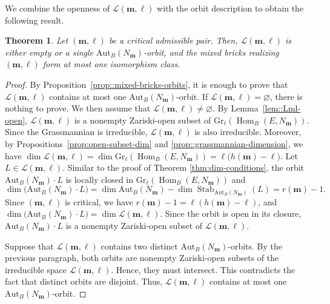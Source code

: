 \documentclass[a4,12pt]{amsart}
\numberwithin{equation}{section} %
\def\Hom{\operatorname{Hom}} %
\def\Stab{\operatorname{Stab}} %
\def\Gr{\mathrm{Gr}} %
\def\Aut{\mathrm{Aut}} %
\newtheorem{theorem}{Theorem}[section] %
\theoremstyle{definition} %
\begin{document}
We combine the openness of $\mathcal{L}(\mathbf{m},\ell)$ with the orbit description to obtain the following result.

\begin{theorem}\label{thm::critical-pair-one-orbit}
Let $(\mathbf{m},\ell)$ be a critical admissible pair. Then,
$\mathcal{L}(\mathbf{m},\ell)$ is either empty or a single
$\Aut_B(N_{\mathbf{m}})$-orbit, and the mixed bricks realizing $(\mathbf{m},\ell)$ form at most one isomorphism class.
\end{theorem}
\begin{proof} 
By Proposition~\ref{prop::mixed-bricks-orbits}, it is enough to prove that $\mathcal{L}(\mathbf{m},\ell)$ contains at most one $\Aut_B(N_{\mathbf{m}})$-orbit. If $\mathcal{L}(\mathbf{m},\ell)=\varnothing$, there is nothing to prove. We then assume that $\mathcal{L}(\mathbf{m},\ell)\neq\varnothing$. By Lemma~\ref{lem::Lml-open}, $\mathcal{L}(\mathbf{m},\ell)$ is a nonempty Zariski-open subset of $\Gr_\ell(\Hom_B(E,N_{\mathbf{m}}))$. Since the Grassmannian is irreducible, $\mathcal{L}(\mathbf{m},\ell)$ is also irreducible. Moreover, by Propositions~\ref{prop:open-subset-dim} and \ref{prop::grassmannian-dimension}, we have $\dim \mathcal{L}(\mathbf{m},\ell) = \dim \Gr_\ell(\Hom_B(E,N_{\mathbf{m}})) = \ell\bigl(h(\mathbf{m})-\ell\bigr)$. Let $L\in\mathcal{L}(\mathbf{m},\ell)$. Similar to the proof of Theorem \ref{thm:dim-conditions}, the orbit $\Aut_B(N_{\mathbf{m}})\cdot L$ is locally closed in $\Gr_\ell(\Hom_B(E,N_{\mathbf{m}}))$ and 
\[ 
\dim\bigl(\Aut_B(N_{\mathbf{m}})\cdot L\bigr) = \dim\Aut_B(N_{\mathbf{m}}) - \dim\Stab_{\Aut_B(N_{\mathbf{m}})}(L) = r(\mathbf{m})-1. 
\] 
Since $(\mathbf{m},\ell)$ is critical, we have $r(\mathbf{m})-1=\ell(h(\mathbf{m})-\ell)$, and  $\dim\bigl(\Aut_B(N_{\mathbf{m}})\cdot L\bigr) = \dim\mathcal{L}(\mathbf{m},\ell)$. Since the orbit is open in its closure, $\Aut_B(N_{\mathbf{m}})\cdot L$ is a nonempty Zariski-open subset of $\mathcal{L}(\mathbf{m},\ell)$. 



Suppose that $\mathcal{L}(\mathbf{m},\ell)$ contains two distinct $\Aut_B(N_{\mathbf{m}})$-orbits. By the previous paragraph, both orbits are nonempty Zariski-open subsets of the irreducible space $\mathcal{L}(\mathbf{m},\ell)$. Hence, they must intersect. This contradicts the fact that distinct orbits are disjoint. Thus, $\mathcal{L}(\mathbf{m},\ell)$ contains at most one $\Aut_B(N_{\mathbf{m}})$-orbit.
\end{proof}
\end{document}
